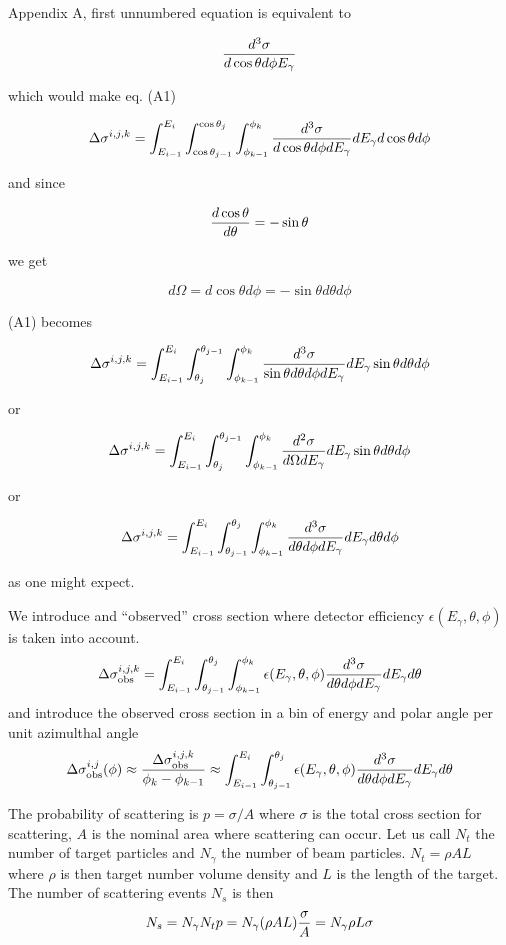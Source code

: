 \documentclass{article}
\begin{document}
Appendix A, first unnumbered equation is equivalent to 

$${d^3\sigma \over d\cos\theta d\phi E_\gamma}$$

which would make eq. (A1)

$$\Delta\sigma^{i,j,k} = \int^{E_i}_{E_{i-1}}\int^{\cos\theta_j}_{\cos\theta_{j-1}}\int^{\phi_k}_{\phi_{k-1}} {d^3\sigma \over d\cos\theta d\phi dE_\gamma}dE_\gamma d\cos\theta d\phi$$

and since

$${d\cos\theta \over d\theta} = -\sin\theta$$

we get

$$ d\Omega = d\cos\theta d\phi = -\sin\theta d\theta d\phi $$

(A1) becomes

$$\Delta\sigma^{i,j,k} = \int^{E_i}_{E_{i-1}}\int_{\theta_j}^{\theta_{j-1}}\int^{\phi_k}_{\phi_{k-1}} {d^3\sigma \over \sin\theta d\theta d\phi dE_\gamma} dE_\gamma \sin\theta d\theta d\phi$$

or

$$\Delta\sigma^{i,j,k} = \int^{E_i}_{E_{i-1}}\int_{\theta_j}^{\theta_{j-1}}\int^{\phi_k}_{\phi_{k-1}} {d^2\sigma \over d\Omega dE_\gamma} dE_\gamma \sin\theta d\theta d\phi$$

or

$$\Delta\sigma^{i,j,k} = \int^{E_i}_{E_{i-1}}\int_{\theta_{j-1}}^{\theta_j}\int^{\phi_k}_{\phi_{k-1}} {d^3\sigma \over d\theta d\phi dE_\gamma} dE_\gamma d\theta d\phi$$

as one might expect.

We introduce and ``observed'' cross section where detector efficiency $\epsilon(E_\gamma,\theta,\phi)$ is taken into account.
$$
\Delta\sigma^{i,j,k}_{\rm obs} = \int^{E_i}_{E_{i-1}}\int_{\theta_{j-1}}^{\theta_j}\int^{\phi_k}_{\phi_{k-1}} \epsilon(E_\gamma,\theta,\phi) {d^3\sigma \over d\theta d\phi dE_\gamma} dE_\gamma d\theta
$$
and introduce the observed cross section in a bin of energy and polar angle per unit azimulthal angle
$$
\Delta\sigma^{i,j}_{\rm obs}(\phi) \approx {\Delta\sigma^{i,j,k}_{\rm obs} \over \phi_k - \phi_{k-1}} \approx \int^{E_i}_{E_{i-1}}\int_{\theta_{j-1}}^{\theta_j} \epsilon(E_\gamma,\theta,\phi) {d^3\sigma \over d\theta d\phi dE_\gamma} dE_\gamma d\theta$$

The probability of scattering is $p = \sigma/A$ where $\sigma$ is the total cross section for scattering, $A$ is the nominal area where scattering can occur. Let us call $N_t$ the number of target particles and $N_\gamma$ the number of beam particles. $N_t = \rho AL$ where $\rho$ is then target number volume density and $L$ is the length of the target. The number of scattering events $N_s$ is then
$$
N_s = N_\gamma N_t p = N_\gamma(\rho A L){\sigma\over A} = N_\gamma\rho L\sigma
$$
\end{document}
